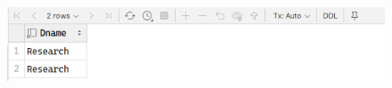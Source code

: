 \documentclass[12pt,titlepage]{article}
\begin{document}
\begin{enumerate}[label=\Alph*.]
{\begin{enumerate}[label={\arabic*.}]
{                \begin{figure}[h]
                    \centering
                    \includegraphics[width=.8\textwidth]{./images/output_10.png}
                \end{figure}
            }
        \end{enumerate}
    }
\end{enumerate}
\end{document}
